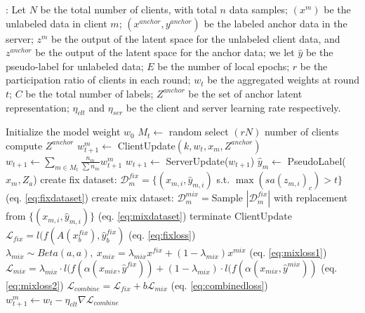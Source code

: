 \documentclass[withindex,glossary,firstyr]{cam-thesis}
\begin{document}
\begin{algorithm}[!t]
    \caption{\small\textbf{\method}: Let $N$ be the total number of clients, with total $n$ data samples; $(x^m)$ be the unlabeled data in client $m$; $(x^{anchor}, y^{anchor})$ be the labeled anchor data in the server; $z^m$ be the output of the latent space for the unlabeled client data, and $z^{anchor}$ be the output of the latent space for the anchor data; we let $\hat{y}$ be the pseudo-label for unlabeled data; $E$ be the number of local epochs; $r$ be the participation ratio of clients in each round; $w_t$ be the aggregated weights at round $t$; $C$ be the total number of labels; $Z^{anchor}$ be the set of anchor latent representation; $\eta_{clt}$ and $\eta_{ser}$ be the client and server learning rate respectively.} \label{algorithm:algo}
    \begin{algorithmic}
        \State Initialize the model weight $w_0$
            \State $M_t \leftarrow$ random select $(rN)$ number of clients 
            \State compute $Z^{anchor}$
                \State $w_{t+1}^m \leftarrow$  ClientUpdate$(k,w_t, x_{m},Z^{anchor})$
            \EndFor
        \EndFor
        \State $w_{t+1} \leftarrow \sum_{m \in M_t} \frac{n_m}{\sum n_m} w_{t+1}^m$
        \State $w_{t+1} \leftarrow$ ServerUpdate($w_{t+1}$)
    \EndProcedure
        \State $\hat{y}_m \leftarrow$ PseudoLabel($x_{m}, Z_a$)
        \State create fix dataset: $\mathcal{D}^{fix}_m = \{  (x_{m, i}, \hat{y}_{m, i} )$ s.t. $\max(sa(z_{m, i})_c) > t \}$ (eq. \ref{eq:fixdataset})
            \State create mix dataset: $\mathcal{D}^{mix}_{m} = $Sample $|\mathcal{D}^{fix}_{m}|$  with replacement from  $\{ (x_{m, i}, \hat{y}_{m, i} )\}$ (eq. \ref{eq:mixdataset})
        \Else
            \State terminate ClientUpdate
        \EndIf
        \State $\mathcal{L}_{fix} = l(f(A(x^{fix}_b), \hat{y}^{fix}_b)$ (eq. \ref{eq:fixloss})
        \State $\lambda_{mix} \sim Beta(a,a), \ x_{mix} = \lambda_{mix} x^{fix} + (1-\lambda_{mix}) x^{mix}$  (eq. \ref{eq:mixloss1})
        \State $\mathcal{L}_{mix} = \lambda_{mix} \cdot l(f(\alpha(x_{mix}, \hat{y}^{fix})) + (1-\lambda_{mix} ) \cdot l(f(\alpha(x_{mix}, \hat{y}^{mix}))$  (eq. \ref{eq:mixloss2})
        \State $\mathcal{L}_{combine} = \mathcal{L}_{fix} + b\mathcal{L}_{mix}$  (eq. \ref{eq:combinedloss})
        \State $w_{t+1}^m \leftarrow w_t - \eta_{clt} \nabla \mathcal{L}_{combine}$

\end{algorithmic}
\end{algorithm}
\end{document}
